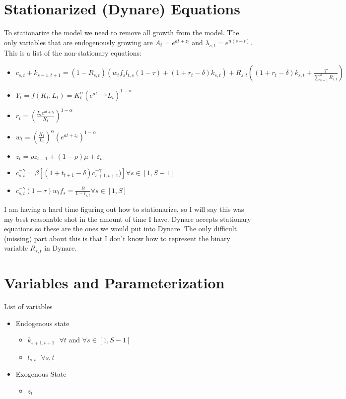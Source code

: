 \documentclass[paper=a4, fontsize=11pt]{scrartcl} %
\newcommand\ve{\varepsilon}
\numberwithin{figure}{section} %
\numberwithin{table}{section} %
\begin{document}
\section{Stationarized (Dynare) Equations}

    To stationarize the model we need to remove all growth from the model. The only variables that are endogenously growing are $A_t = e^{at + z_t}$ and $\lambda_{s,t} = e^{n(s+t)}$. This is a list of the non-stationary equations:

    \begin{itemize}
        \item $c_{s, t} + k_{s+1, t+1} = (1 - R_{s,t}) \left(w_t f_s l_{t, s} (1 - \tau) + (1 + r_t - \delta) k_{s, t}\right) + R_{s, t} \left((1 + r_t - \delta) k_{s, t} + \frac{T}{\sum_{s=1}^S R_{s, t}}\right)$
        \item $Y_t = f(K_t, L_t) = K_t^{\alpha} (e^{at + z_t} L_t) ^{1 - \alpha}$
        \item $r_t = \left(\frac{L_t e^{at + z_t}}{K_t} \right)^{1 - \alpha}$
        \item $w_t = \left(\frac{K_t}{L_t} \right)^{\alpha} (e^{at + z_t})^{1 - \alpha}$
        \item $z_t =\rho z_{t-1} + (1 - \rho) \mu + \ve_t$
        \item $c_{s, t}^{-\gamma}= \beta \left[(1 + t_{t+1} - \delta) c_{s+1, t+1}^{-\gamma})  \right] \forall s \in [1, S-1]$
        \item $c_{s, t}^{-\gamma} (1 - \tau) w_t f_s = \frac{B}{1 - l_{s,t}} \forall s \in [1, S]$
    \end{itemize}

    I am having a hard time figuring out how to stationarize, so I will say this was my best reasonable shot in the amount of time I have. Dynare accepts stationary equations so these are the ones we would put into Dynare. The only difficult (missing) part about this is that I don't know how to represent the binary variable $R_{s,t}$ in Dynare.

\section{Variables and Parameterization}

      List of variables

      \begin{itemize}
      	\item Endogenous state
      	\begin{itemize}
      		\item $k_{s+1, t+1} \text{ } \forall t \text{ and } \forall s \in [1, S-1]$
      		\item $l_{s, t} \text{ } \forall s, t$
      	\end{itemize}
      	\item Exogenous State
      	\begin{itemize}
      		\item $z_t$
      	\end{itemize}
      \end{itemize}
\end{document}

